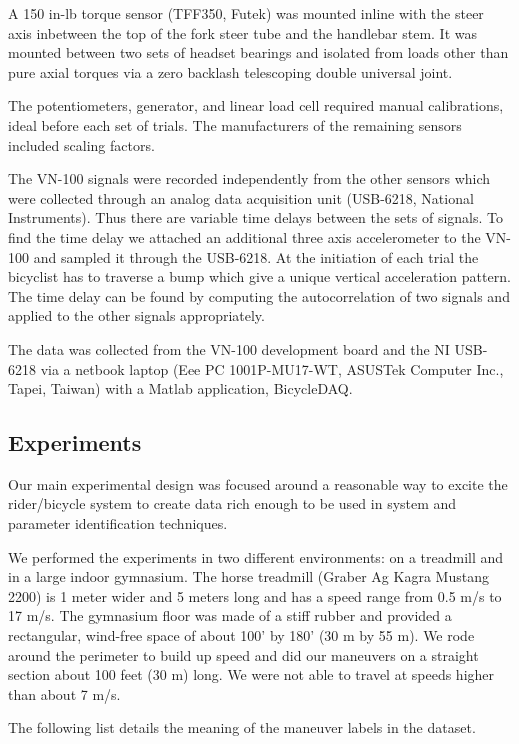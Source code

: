 \documentclass{article}
\begin{document}
A 150 in-lb torque sensor (TFF350, Futek) was mounted inline with the steer
axis inbetween the top of the fork steer tube and the handlebar stem. It was
mounted between two sets of headset bearings and isolated from loads other than
pure axial torques via a zero backlash telescoping double universal joint.

The potentiometers, generator, and linear load cell required manual
calibrations, ideal before each set of trials. The manufacturers of the
remaining sensors included scaling factors.

The VN-100 signals were recorded independently from the other sensors which
were collected through an analog data acquisition unit (USB-6218, National
Instruments). Thus there are variable time delays between the sets of signals.
To find the time delay we attached an additional three axis accelerometer to
the VN-100 and sampled it through the USB-6218. At the initiation of each trial
the bicyclist has to traverse a bump which give a unique vertical acceleration
pattern. The time delay can be found by computing the autocorrelation of two
signals and applied to the other signals appropriately.

The data was collected from the VN-100 development board and the NI USB-6218
via a netbook laptop (Eee PC 1001P-MU17-WT, ASUSTek Computer Inc., Tapei,
Taiwan) with a Matlab application, BicycleDAQ.

\subsection{Experiments}

Our main experimental design was focused around a reasonable way to excite the
rider/bicycle system to create data rich enough to be used in system and
parameter identification techniques.

We performed the experiments in two different environments: on a treadmill and
in a large indoor gymnasium. The horse treadmill (Graber Ag Kagra Mustang 2200)
is 1 meter wider and 5 meters long and has a speed range from 0.5 m/s to 17
m/s. The gymnasium floor was made of a stiff rubber and provided a rectangular,
wind-free space of about 100' by 180' (30 m by 55 m). We rode around the
perimeter to build up speed and did our maneuvers on a straight section about
100 feet (30 m) long. We were not able to travel at speeds higher than about 7
m/s.

The following list details the meaning of the maneuver labels in the dataset.
\end{document}
